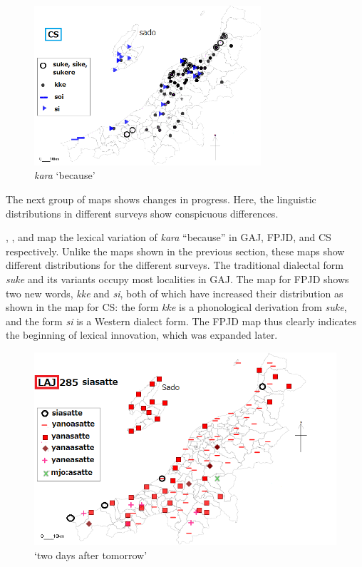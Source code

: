 \documentclass[output=paper]{LSP/langsci}
\begin{document}
\begin{figure}
\includegraphics[width=0.75\textwidth]{illustrations/fuku2_fig4c}
\caption{\textit{kara} `because'}
\label{fig:4c}
\end{figure}

The next group of maps shows changes in progress. Here, the linguistic distributions in different surveys show conspicuous differences. 

, , and  map the lexical variation of \textit{kara} “because”  in GAJ, FPJD, and CS respectively.  Unlike the maps shown in the previous section, these maps show different distributions for the different surveys.  The traditional dialectal form \textit{suke} and its variants occupy most localities in GAJ.  The map for FPJD shows two new words, \textit{kke} and \textit{si}, both of which have increased their distribution as shown in the map for CS: the form \textit{kke} is a phonological derivation from \textit{suke}, and the form \textit{si} is a Western dialect form.  The FPJD map thus clearly indicates the beginning of lexical innovation, which was expanded later.

\begin{figure}
\includegraphics[width=.75\textwidth]{illustrations/fuku2_fig5a}
\caption{`two days after tomorrow'}
\label{fig:5a}
\end{figure}
\end{document}
